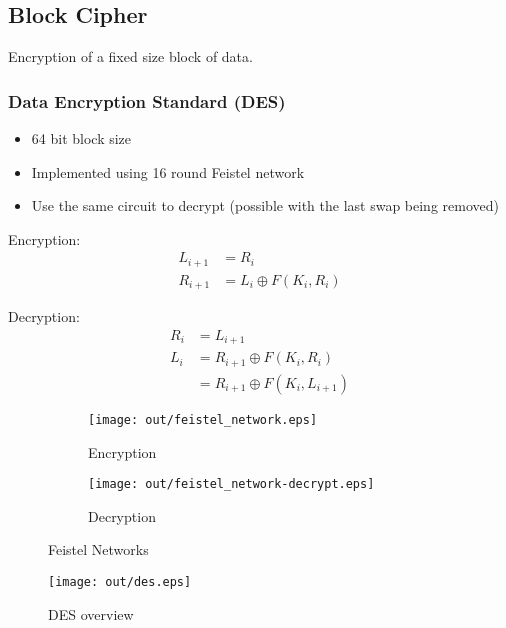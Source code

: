 \documentclass[a4paper]{article}
\begin{document}
\subsection{Block Cipher}

Encryption of a fixed size block of data.

\subsubsection{Data Encryption Standard (DES)}

\begin{itemize}
  \item 64 bit block size
  \item Implemented using 16 round Feistel network
  \item Use the same circuit to decrypt (possible with the last swap being
        removed)
\end{itemize}

Encryption:
\begin{align*}
  L_{i+1} &= R_{i} \\
  R_{i+1} &= L_{i} \oplus F(K_{i}, R_{i})
\end{align*}

Decryption:
\begin{align*}
  R_{i} &= L_{i+1} \\
  L_{i} &= R_{i+1} \oplus F(K_{i}, R_{i}) \\
        &= R_{i+1} \oplus F(K_{i}, L_{i+1})
\end{align*}

\begin{figure}[h]
  \centering
  \begin{subfigure}[t!]{0.4\textwidth}
    \texttt{[image: out/feistel\_network.eps]}
    \caption{Encryption}
    \label{fig:feistel_network}
  \end{subfigure}
  \begin{subfigure}[t!]{0.4\textwidth}
    \texttt{[image: out/feistel\_network-decrypt.eps]}
    \caption{Decryption}
    \label{fig:feistel_network_decrypt}
  \end{subfigure}
  \caption{Feistel Networks}
  \label{fig:feistel_networks}
\end{figure}
\FloatBarrier

\begin{figure}[h!]
  \centering
  \texttt{[image: out/des.eps]}
  \caption{DES overview}
  \label{fig:des}
\end{figure}
\FloatBarrier
\end{document}

